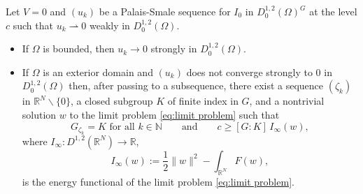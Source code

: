 \documentclass[10pt,a4paper]{amsart}
\def\irn{\int_{\r^N}}
\def\o{\Omega}
\def\rh{\rightharpoonup}
\def\rn{\mathbb{R}^N}
\def\r{\mathbb{R}}
\begin{document}
\begin{lemma}\label{lem:spliting} 
Let $V=0$ and $(u_k)$ be a Palais-Smale sequence for $I_0$ in $D^{1,2}_0(\o)^G$ at the level $c$ such that  $u_k\rh 0$ weakly in $D^{1,2}_0(\o)$. 
\begin{itemize}
\item[$(a)$] If $\o$ is bounded, then $u_k\to 0$ strongly in $D^{1,2}_0(\o)$. 
\item[$(b)$] If $\o$ is an exterior domain and $(u_k)$ does not converge strongly to $0$ in $D^{1,2}_0(\o)$ then, after passing to a subsequence, there exist a sequence $(\zeta_k)$ in $\rn\smallsetminus\{0\}$, a closed subgroup $K$ of finite index in $G$, and a nontrivial solution $w$ to the limit problem \eqref{eq:limit problem} such that
$$G_{\zeta_k}= K\text{ \ for all \ }k \in \mathbb{N}\qquad\text{and}\qquad c\geq[G:K] \, I_{\infty}(w),$$ 
where $I_\infty:D^{1,2}(\rn)\to\r$,
$$I_\infty(w):=\frac{1}{2}\|w\|^2-\irn F(w),$$
is the energy functional of the limit problem \eqref{eq:limit problem}.  
\end{itemize}
\end{lemma}
\end{document}
